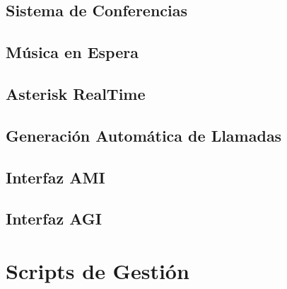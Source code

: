 \subsection*{Sistema de Conferencias}



\subsection*{Música en Espera}



\subsection*{Asterisk RealTime}









\subsection*{Generación Automática de Llamadas}



\subsection*{Interfaz AMI}



\subsection*{Interfaz AGI}




\section*{Scripts de Gestión}

